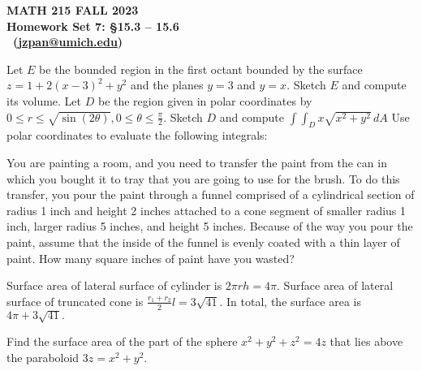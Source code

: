 \documentclass[12pt]{exam}
\author{Zhengyu James Pan} %
\makeatletter
\def\hwName{Homework Set 7: §15.3 – 15.6}
\def\email{jzpan@umich.edu}
\makeatother
\begin{document}
\pagestyle{head}
\firstpageheader{}{}{}
\header{MATH 215}{\hwName}{\thepage}

\printanswers
\unframedsolutions

{\parindent0in
\begin{center}
	\bf MATH 215 FALL 2023\\
	\bf \hwName \\
	\@author\ (\href{mailto:\email}{\email})
\end{center}
}

\begin{questions}
\question Let $E$ be the bounded region in the first octant bounded by the surface $z = 1 + 2(x - 3)^2 + y^2$ and the planes $y = 3$ and $y = x$. Sketch $E$ and compute its volume.
\question Let $D$ be the region given in polar coordinates by $0 \leq r \leq \sqrt {\sin(2\theta)}, 0 \leq \theta \leq \frac{\pi}{2}$. Sketch $D$ and compute $\int \int_{D}x\sqrt{x^2 + y^2} \, dA$
\question Use polar coordinates to evaluate the following integrals:

\question  You are painting a room, and you need to transfer the paint from the can in which you bought it to tray that you are going to use for the brush. To do this transfer, you pour the paint through a funnel comprised of a cylindrical section of radius 1 inch and height 2 inches attached to a cone segment of smaller radius 1 inch, larger radius 5 inches, and height 5 inches. Because of the way you pour the paint, assume that the inside of the funnel is evenly coated with a thin layer of paint. How many square inches of paint have you wasted?
    \begin{solution}
        Surface area of lateral surface of cylinder is $2\pi r h = 4 \pi$.
        Surface area of lateral surface of truncated cone is $\frac{r_1 + r_2}{2} l = 3 \sqrt{41}$.
        In total, the surface area is $\boxed{ 4 \pi + 3 \sqrt{41} }. $
    \end{solution}
\question Find the surface area of the part of the sphere $x^2+y^2+z^2 = 4z$ that lies above the paraboloid $3z = x^2+y^2$.
    \begin{solution}
        

\end{solution}
\end{questions}
\end{document}
